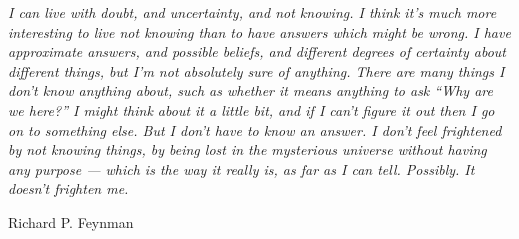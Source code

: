 \documentclass[a4paper,12pt]{memoir}
\begin{document}
\frontmatter
\newpage
\thispagestyle{empty}
\begin{flushleft}
  \textit{I can live with doubt, and uncertainty, and not knowing. I
    think it's much more interesting to live not knowing than to have
    answers which might be wrong. I have approximate answers, and
    possible beliefs, and different degrees of certainty about
    different things, but I'm not absolutely sure of anything. There
    are many things I don't know anything about, such as whether it
    means anything to ask ``Why are we here?'' I might think about it a
    little bit, and if I can't figure it out then I go on to something
    else. But I don't have to know an answer. I don't feel frightened
    by not knowing things, by being lost in the mysterious universe
    without having any purpose — which is the way it really is, as far
    as I can tell. Possibly. It doesn't frighten me.}\\
\end{flushleft}
\begin{flushright}
  Richard P. Feynman
\end{flushright}
\null\vfil
\newpage

\newpage
\begin{abstract}
  \blindtext %
\end{abstract}
\newpage

\hypersetup{pageanchor=true}

\mainmatter
\tableofcontents




%


% 

\appendix{
}


\end{document}

